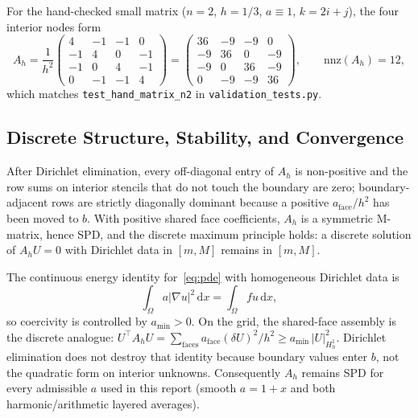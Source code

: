 \documentclass[11pt,a4paper]{article}
\begin{document}
For the hand-checked small matrix (\(n=2\), \(h=1/3\), \(a\equiv 1\), \(k=2i+j\)), the four interior nodes form
\begin{equation}
A_h = \frac{1}{h^2}
\begin{pmatrix}
4 & -1 & -1 & 0\\
-1 & 4 & 0 & -1\\
-1 & 0 & 4 & -1\\
0 & -1 & -1 & 4
\end{pmatrix}
=
\begin{pmatrix}
36 & -9 & -9 & 0\\
-9 & 36 & 0 & -9\\
-9 & 0 & 36 & -9\\
0 & -9 & -9 & 36
\end{pmatrix},
\qquad \mathrm{nnz}(A_h)=12,
\label{eq:handn2}
\end{equation}
which matches \texttt{test\_hand\_matrix\_n2} in \texttt{validation\_tests.py}.

\subsection{Discrete Structure, Stability, and Convergence}
After Dirichlet elimination, every off-diagonal entry of \(A_h\) is non-positive and the row sums on interior stencils that do not touch the boundary are zero; boundary-adjacent rows are strictly diagonally dominant because a positive \(a_{\mathrm{face}}/h^2\) has been moved to \(b\).
With positive shared face coefficients, \(A_h\) is a symmetric M-matrix, hence SPD, and the discrete maximum principle holds: a discrete solution of \(A_h U=0\) with Dirichlet data in \([m,M]\) remains in \([m,M]\).

The continuous energy identity for~\eqref{eq:pde} with homogeneous Dirichlet data is
\begin{equation}
\int_\Omega a|\nabla u|^2\,\mathrm{d}x
=\int_\Omega f u\,\mathrm{d}x,
\label{eq:energy}
\end{equation}
so coercivity is controlled by \(a_{\min}>0\).
On the grid, the shared-face assembly is the discrete analogue: \(U^\top A_h U=\sum_{\mathrm{faces}} a_{\mathrm{face}}(\delta U)^2/h^2\ge a_{\min}\,|U|_{H^1_h}^2\).
Dirichlet elimination does not destroy that identity because boundary values enter \(b\), not the quadratic form on interior unknowns.
Consequently \(A_h\) remains SPD for every admissible \(a\) used in this report (smooth \(a=1+x\) and both harmonic/arithmetic layered averages).
\end{document}
